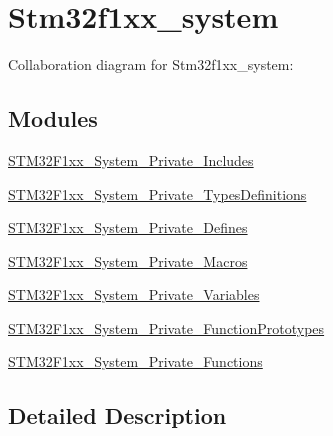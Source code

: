 \hypertarget{group__stm32f1xx__system}{}\section{Stm32f1xx\+\_\+system}
\label{group__stm32f1xx__system}
Collaboration diagram for Stm32f1xx\+\_\+system\+:
\subsection*{Modules}
\begin{DoxyCompactItemize}
\item 
\hyperlink{group__STM32F1xx__System__Private__Includes}{S\+T\+M32\+F1xx\+\_\+\+System\+\_\+\+Private\+\_\+\+Includes}
\item 
\hyperlink{group__STM32F1xx__System__Private__TypesDefinitions}{S\+T\+M32\+F1xx\+\_\+\+System\+\_\+\+Private\+\_\+\+Types\+Definitions}
\item 
\hyperlink{group__STM32F1xx__System__Private__Defines}{S\+T\+M32\+F1xx\+\_\+\+System\+\_\+\+Private\+\_\+\+Defines}
\item 
\hyperlink{group__STM32F1xx__System__Private__Macros}{S\+T\+M32\+F1xx\+\_\+\+System\+\_\+\+Private\+\_\+\+Macros}
\item 
\hyperlink{group__STM32F1xx__System__Private__Variables}{S\+T\+M32\+F1xx\+\_\+\+System\+\_\+\+Private\+\_\+\+Variables}
\item 
\hyperlink{group__STM32F1xx__System__Private__FunctionPrototypes}{S\+T\+M32\+F1xx\+\_\+\+System\+\_\+\+Private\+\_\+\+Function\+Prototypes}
\item 
\hyperlink{group__STM32F1xx__System__Private__Functions}{S\+T\+M32\+F1xx\+\_\+\+System\+\_\+\+Private\+\_\+\+Functions}
\end{DoxyCompactItemize}


\subsection{Detailed Description}
